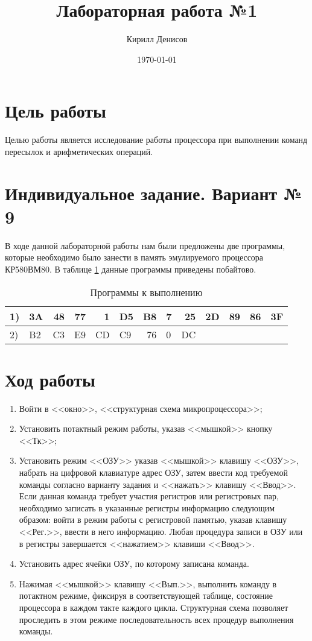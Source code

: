 \documentclass[a4paper,14pt]{extarticle}
\author{Кирилл Денисов}
\title{Лабораторная работа №1}
\date{\today}
\newcommand{\pathToCommonFolder}{/home/denilai/Documents/repos/latex/Common}
\begin{document}
	\thispagestyle{empty}
	
	\newpage
	
\section*{Цель работы}
Целью работы является исследование
работы процессора при выполнении команд пересылок и
арифметических операций.
\section*{Индивидуальное задание. Вариант № 9}
В ходе данной лабораторной работы нам были предложены две программы, которые необходимо было занести в память эмулируемого процессора КР580ВМ80. В таблице \ref{tab:progs} данные программы приведены побайтово.
\begin{table}[htbp]
		\caption{Программы к выполнению}
	\begin{center}
		\begin{tabular}{|l|l|l|l|l|l|l|l|l|l|l|l|l|}
			\hline
			1) & 3A & \multicolumn{1}{r|}{48} & \multicolumn{1}{r|}{77} & \multicolumn{1}{r|}{1} & D5 & B8 & 7 & \multicolumn{1}{r|}{25} & 2D & \multicolumn{1}{r|}{89} & \multicolumn{1}{r|}{86}&3F \\ \hline
			2) & B2 & C3 & E9 & CD & C9 & \multicolumn{1}{r|}{76} & 0 & DC & & & &\\ \hline
		\end{tabular}
	\end{center}

	\label{tab:progs}
\end{table}
\section*{Ход работы}
\begin{enumerate}
\item Войти в
<<окно>>,
<<структурная
схема
микропроцессора>>;
\item 
Установить потактный режим работы, указав
<<мышкой>> кнопку <<Тк>>;
\item
Установить режим <<ОЗУ>> указав <<мышкой>>
клавишу <<ОЗУ>>, набрать на цифровой клавиатуре адрес
ОЗУ, затем ввести код требуемой команды согласно
варианту задания и <<нажать>> клавишу <<Ввод>>. Если данная
команда требует участия регистров или регистровых пар,
необходимо записать в указанные регистры информацию
следующим образом: войти в режим работы с регистровой
памятью, указав клавишу <<Рег.>>, ввести в него информацию.
Любая процедура записи в ОЗУ или в регистры завершается <<нажатием>> клавиши <<Ввод>>.
\item 
Установить адрес ячейки ОЗУ, по которому
записана команда.
\item 
Нажимая <<мышкой>> клавишу <<Вып.>>, выполнить
команду в потактном режиме, фиксируя в соответствующей таблице,
состояние процессора в каждом такте каждого цикла.
Структурная схема позволяет проследить в этом режиме
последовательность всех процедур выполнения команды.
\end{enumerate}
\end{document}
